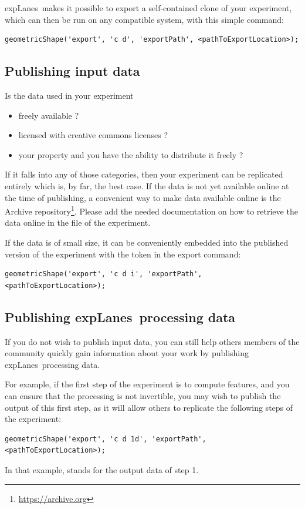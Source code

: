 \documentclass[a4paper,fleqn]{tufte-handout}
\newcommand{\explanes}{\textsf{expLanes}\ }
\begin{document}
\explanes makes it possible to export a self-contained clone of your experiment, which can then be run on any compatible system, with this simple command:
\begin{lstlisting}
geometricShape('export', 'c d', 'exportPath', <pathToExportLocation>);
\end{lstlisting}


\subsection{Publishing input data}

Is the data used in your experiment
\begin{itemize}
\item freely available ? 
\item licensed with creative commons licenses ?
\item your property and you have the ability to distribute it freely ?
\end{itemize} 

If it falls into any of those categories, then your experiment can be replicated entirely which is, by far, the best case. If the data is not yet available online at the time of publishing, a convenient way to make data available online is the Archive repository\footnote{\url{https://archive.org}}. Please add the needed documentation on how to retrieve the data online in the  file of the experiment.

If the data is of small size, it can be conveniently embedded into the published version of the experiment with the  token in the export command:
\begin{lstlisting}
geometricShape('export', 'c d i', 'exportPath', <pathToExportLocation>);
\end{lstlisting}

\subsection{Publishing \explanes processing data}

If you do not wish to publish input data, you can still help others members of the community quickly gain information about your work by publishing \explanes processing data.

For example, if the first step of the experiment is to compute features, and you can ensure that the processing is not invertible, you may wish to publish the output of this first step, as it will allow others to replicate the following steps of the experiment:
\begin{lstlisting}
geometricShape('export', 'c d 1d', 'exportPath', <pathToExportLocation>);
\end{lstlisting} 
In that example,  stands for the output data of step 1.
\end{document}

